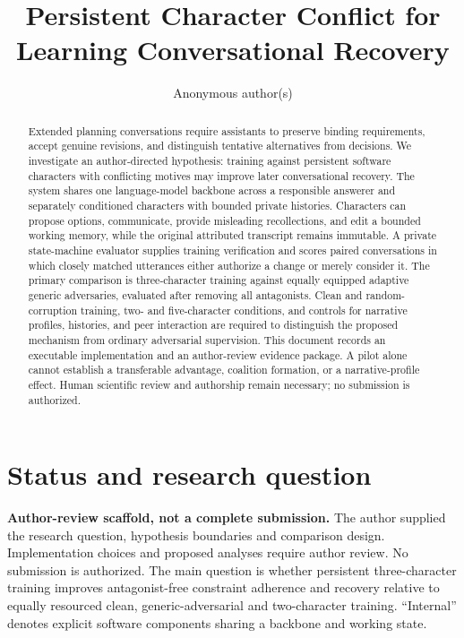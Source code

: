 \documentclass{svproc}
\begin{document}
\mainmatter
\title{Persistent Character Conflict for Learning Conversational Recovery}
\author{Anonymous author(s)}
\maketitle
\begin{abstract}
Extended planning conversations require assistants to preserve binding requirements,
accept genuine revisions, and distinguish tentative alternatives from decisions.
We investigate an author-directed hypothesis: training against persistent software
characters with conflicting motives may improve later conversational recovery.
The system shares one language-model backbone across a responsible
answerer and separately conditioned characters with bounded private histories.
Characters can propose options, communicate, provide misleading recollections,
and edit a bounded working memory, while the original attributed transcript remains
immutable. A private state-machine evaluator supplies training verification and
scores paired conversations in which closely matched utterances either authorize
a change or merely consider it. The primary comparison is three-character training
against equally equipped adaptive generic adversaries, evaluated after removing
all antagonists. Clean and random-corruption training, two- and five-character
conditions, and controls for narrative profiles, histories, and peer interaction
are required to distinguish the proposed mechanism from ordinary adversarial
supervision. This document records an executable implementation and an author-review
evidence package. A pilot alone cannot establish a transferable advantage, coalition
formation, or a narrative-profile effect.
Human scientific review and authorship remain necessary; no submission is authorized.
\end{abstract}

\section{Status and research question}
\textbf{Author-review scaffold, not a complete submission.} The author supplied
the research question, hypothesis boundaries and comparison design. Implementation
choices and proposed analyses require author review. No submission is authorized.
The main question is whether persistent three-character training improves
antagonist-free constraint adherence and recovery relative to equally resourced
clean, generic-adversarial and two-character training. ``Internal'' denotes
explicit software components sharing a backbone and working state.
\end{document}
